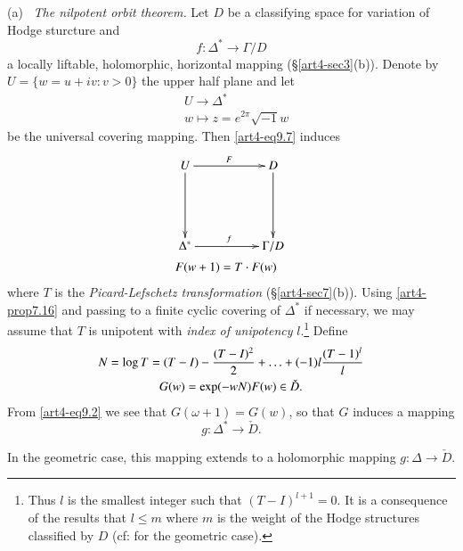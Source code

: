 \noindent
(a)~ \textit{The nilpotent orbit theorem.} Let $D$ be a classifying space for variation of Hodge sturcture and
\setcounter{equation}{0}
\begin{equation}
f : \Delta^\ast \to\Gamma / D\label{art4-eq9.1}
\end{equation}
a locally liftable, holomorphic, horizontal mapping (\S \ref{art4-sec3}(b)). Denote by $U = \{w = u + i v : v > 0\}$ the upper half plane and let
\begin{align*}
&U \longrightarrow \Delta^\ast\\
&w \longmapsto z = e^{2\pi} \sqrt{-1} w
\end{align*}
be the universal covering mapping. Then \eqref{art4-eq9.7} induces
\begin{align}
& 
\vcenter{
\xymatrix@=1.8cm{
U \ar[r]^F \ar[d] & D \ar[d]\\
\Delta^\ast \ar[r]^f & \Gamma / D }}\label{art4-eq9.2}\\
& F (w + 1) = T \cdot F (w) \notag
\end{align}\pageoriginale
where $T$ is the \textit{Picard-Lefschetz transformation} (\cf \S \ref{art4-sec7}(b)). Using \eqref{art4-prop7.16} and passing to a finite cyclic covering of $\Delta^\ast$ if necessary, we may assume that $T$ is unipotent with \textit{index of unipotency} $l$.\footnote[38]{Thus $l$ is the smallest integer such that $(T - I)^{l+1} =0$. It is a consequence of the results \cite{art4-key41} that $l \leqslant m$ where $m$ is the weight of the Hodge structures classified by $D$ (cf: \cite{art4-key35} for the geometric case).} Define
\begin{gather}  
N = \log T = (T - I) - \frac{(T - I)^2}{2} + \ldots + (-1)l\frac{(T-1)^l}{l}\notag\\
G (w) = \exp (-w N) F (w) \in \check{D}. \label{art4-eq9.3}
\end{gather}
From \eqref{art4-eq9.2} we see that $G (\omega+1) = G (w)$, so that $G$ induces a mapping
$$
g : \Delta^\ast \to \check{D}.
$$

\begin{proposition}\label{art4-eq9.4}
In the geometric case, this mapping extends to a holomorphic mapping $g : \Delta \to \check{D}$.
\end{proposition}

